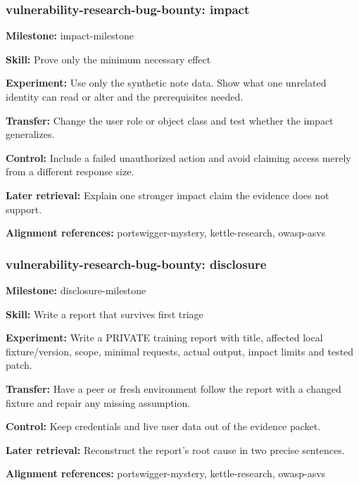 \subsubsection{vulnerability-research-bug-bounty: impact}
\noindent\textbf{Milestone:} impact-milestone\par
\noindent\textbf{Skill:} Prove only the minimum necessary effect\par
\noindent\textbf{Experiment:} Use only the synthetic note data. Show what one unrelated identity can read or alter and the prerequisites needed.\par
\noindent\textbf{Transfer:} Change the user role or object class and test whether the impact generalizes.\par
\noindent\textbf{Control:} Include a failed unauthorized action and avoid claiming access merely from a different response size.\par
\noindent\textbf{Later retrieval:} Explain one stronger impact claim the evidence does not support.\par
\noindent\textbf{Alignment references:} portswigger-mystery, kettle-research, owasp-asvs\par
\subsubsection{vulnerability-research-bug-bounty: disclosure}
\noindent\textbf{Milestone:} disclosure-milestone\par
\noindent\textbf{Skill:} Write a report that survives first triage\par
\noindent\textbf{Experiment:} Write a PRIVATE training report with title, affected local fixture/version, scope, minimal requests, actual output, impact limits and tested patch.\par
\noindent\textbf{Transfer:} Have a peer or fresh environment follow the report with a changed fixture and repair any missing assumption.\par
\noindent\textbf{Control:} Keep credentials and live user data out of the evidence packet.\par
\noindent\textbf{Later retrieval:} Reconstruct the report's root cause in two precise sentences.\par
\noindent\textbf{Alignment references:} portswigger-mystery, kettle-research, owasp-asvs\par

